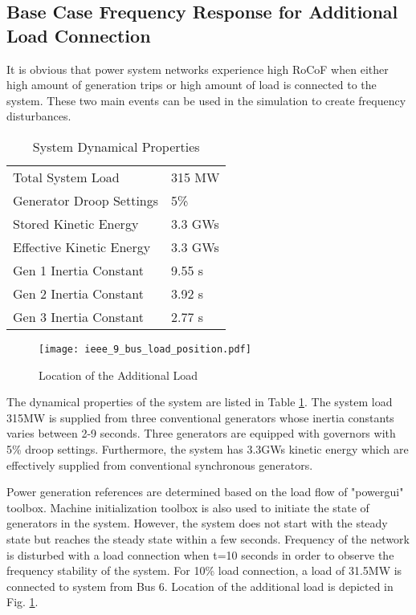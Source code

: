 \subsection{Base Case Frequency Response for Additional Load Connection}
It is obvious that power system networks experience high RoCoF when either high amount of generation trips or high amount of load is connected to the system. These two main events can be used in the simulation to create frequency disturbances.\par
\begin{table}[h]
	\centering
	\begin{tabular}{ll}
		\hline
		Total System Load                      & 315 MW    \\
		Generator Droop Settings               & 5\%       \\
		Stored Kinetic Energy                  & 3.3 GWs \\
		Effective Kinetic Energy               & 3.3 GWs \\
		Gen 1 Inertia Constant                 & 9.55 s  \\
		Gen 2 Inertia Constant                 & 3.92 s  \\
		Gen 3 Inertia Constant                 & 2.77 s  \\ \hline
	\end{tabular}
	\caption{System Dynamical Properties}
	\label{systemdynamicaldata}
\end{table}
\begin{figure}[h!]
	\centering
	\texttt{[image: ieee\_9\_bus\_load\_position.pdf]}
	\caption{Location of the Additional Load}
	\label{ieee_9_bus_load}
\end{figure}
The dynamical properties of the system are listed in Table \ref{systemdynamicaldata}. The system load 315MW is supplied from three conventional generators whose inertia constants varies between 2-9 seconds. Three generators are equipped with governors with 5\% droop settings. Furthermore, the system has 3.3GWs kinetic energy which are effectively supplied from conventional synchronous generators. \par 
Power generation references are determined based on the load flow of "powergui" toolbox. Machine initialization toolbox is also used to initiate the state of generators in the system. However, the system does not start with the steady state but reaches the steady state within a few seconds. Frequency of the network is disturbed with a load connection when t=10 seconds in order to observe the frequency stability of the system. For 10\% load connection, a load of 31.5MW is connected to system from Bus 6. Location of the additional load is depicted in Fig. \ref{ieee_9_bus_load}.\par
